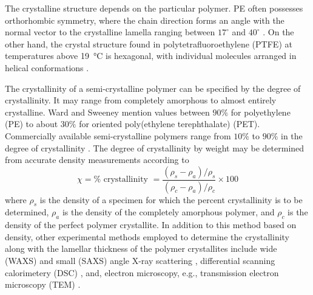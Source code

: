 The crystalline structure depends on the particular polymer.
PE often possesses orthorhombic symmetry, where the chain direction forms an angle with the normal vector to the crystalline lamella ranging between $17^\circ$ and $40^\circ$ \citep{nikolovMicroMacroConstitutive2000}.
On the other hand, the crystal structure found in polytetrafluoroethylene (PTFE) at temperatures above \SI{19}{\celsius} is hexagonal, with individual molecules arranged in helical conformations \citep{bergstromMechanicsSolidPolymers2015}.

The crystallinity of a semi-crystalline polymer can be specified by the degree of crystallinity.
It may range from completely amorphous to almost entirely crystalline.
Ward and Sweeney \citep{wardIntroductionMechanicalProperties2004} mention values between $90\%$ for polyethylene (PE) to about $30\%$ for oriented poly(ethylene terephthalate) (PET).
Commercially available semi-crystalline polymers range from $10\%$ to $90\%$ in the degree of crystallinity \citep{vandommelenMicromechanicalModelingElastoviscoplastic2003}.
The degree of crystallinity by weight may be determined from accurate density measurements according to
\begin{equation}
	\chi = \% \text { crystallinity }=\frac{\left(\rho_{s}-\rho_{a}\right)/\rho_{s}}{\left(\rho_{c}-\rho_{a}\right)/\rho_{c}} \times 100
\end{equation}
where $\rho_{s}$ is the density of a specimen for which the percent crystallinity is to be determined, $\rho_{a}$ is the density of the completely amorphous polymer, and $\rho_{c}$ is the density of the perfect polymer crystallite.
In addition to this method based on density, other experimental methods employed to determine the crystallinity along with the lamellar thickness of the polymer crystallites include wide (WAXS) and small (SAXS) angle X-ray scattering \citep{schrauwenIntrinsicDeformationBehavior2004, hobeikaTemperatureStrainRate2000}, differential scanning calorimetery (DSC) \citep{ayoubEffectsCrystalContent2011}, and, electron microscopy, e.g., transmission electron microscopy (TEM) \citep{bartczakEvolutionCrystallineTexture1992}.

